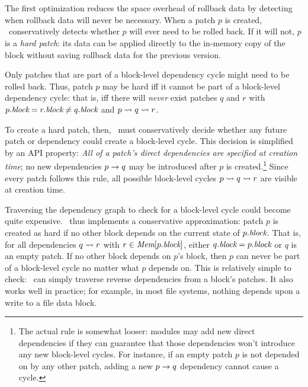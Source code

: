 \subsection{\Nrb\ \ChDescs}
\label{sec:chdescs:nrb}

The first optimization reduces the space overhead of rollback data by
detecting when rollback data will never be necessary.
%
When a patch $p$ is created, \Kudos\ conservatively detects whether $p$
will ever need to be rolled back.
%
If it will not, $p$ is a \emph{hard patch}: its data can be applied
directly to the in-memory copy of the block without saving rollback data
for the previous version.


Only patches that are part of a block-level dependency cycle might need to
be rolled back.
%
Thus, patch $p$ may be hard iff it cannot be part of a block-level
dependency cycle: that is, iff there will \emph{never} exist patches $q$
and $r$ with $p.\textit{block} = r.\textit{block} \neq q.\textit{block}$ and $p \leadsto q
\leadsto r$.


To create a hard patch, then, \Kudos\ must conservatively decide whether
any future patch or dependency could create a block-level cycle.
%
This decision is simplified by an API property: \emph{All of a patch's
direct dependencies are specified at creation time};
%
no new dependencies $p \rightarrow q$ may be introduced after $p$ is
created.\footnote{The actual rule is somewhat looser: modules may add new
direct dependencies if they can guarantee that those dependencies won't
introduce any new block-level cycles.  For instance, if an empty patch $p$
is not depended on by any other patch, adding a new $p \rightarrow q$
dependency cannot cause a cycle.}
%
Since every patch follows this rule, all possible block-level cycles $p
\leadsto q \leadsto r$ are visible at creation time.


Traversing the dependency graph to check for a block-level cycle could
become quite expensive.
%
\Kudos\ thus implements a conservative approximation: patch $p$ is created
as hard if no other block depends on the current state of $p.\textit{block}$.
%
That is, for all dependencies $q \leadsto r$ with $r \in
\PMem[\PBlock{p}]$, either $q.\textit{block} = p.\textit{block}$ or $q$ is an empty
patch.
%
If no other block depends on $p$'s block, then $p$ can never be part of a
block-level cycle no matter what $p$ depends on.
%
This is relatively simple to check: \Kudos\ can simply traverse reverse
dependencies from a block's patches.
%
It also works well in practice; for example, in most file systems, nothing
depends upon a write to a file data block.


